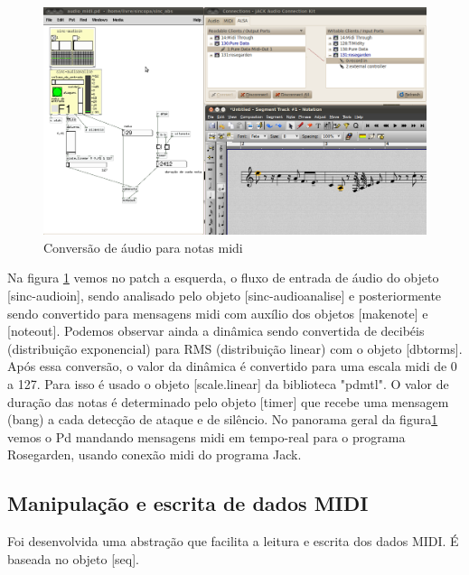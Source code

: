 \documentclass{ppgmus}
\begin{document}
\begin{figure}[!ht]
\includegraphics[scale=.5]{audio2midi}
\caption{Conversão de áudio para notas midi}
\label{audio2midi}
\end{figure}


Na figura \ref{audio2midi} vemos no patch a esquerda, o fluxo de entrada de áudio do objeto
[sinc-audioin], sendo analisado pelo objeto [sinc-audioanalise] e posteriormente
sendo convertido para mensagens midi com auxílio dos objetos [makenote] e [noteout].
Podemos observar ainda a dinâmica sendo convertida de decibéis (distribuição exponencial)
 para RMS (distribuição linear) com o objeto [dbtorms]. Após essa conversão,
o valor da dinâmica é convertido para uma escala midi de 0 a 127. Para isso é usado
o objeto [scale.linear] da biblioteca "pdmtl". O valor de duração das notas é determinado
pelo objeto [timer] que recebe uma mensagem (bang) a cada detecção de ataque e de silêncio.
No panorama geral da figura\ref{audio2midi} vemos o Pd mandando mensagens midi em tempo-real
para o programa Rosegarden, usando conexão midi do programa Jack. 


\subsection{Manipulação e escrita de dados MIDI}

% 




Foi desenvolvida uma abstração que facilita a leitura e escrita dos dados MIDI. É baseada no
objeto [seq].
\end{document}
